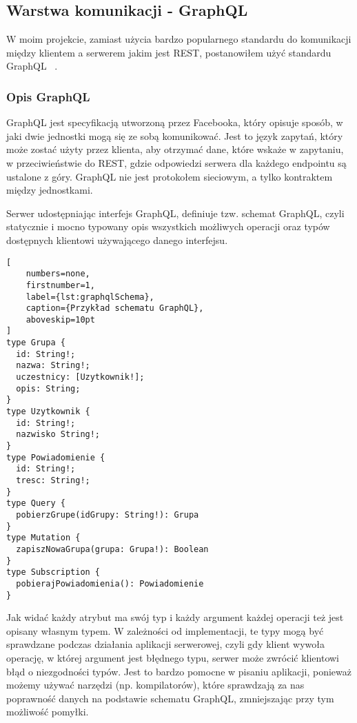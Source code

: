 \subsection{Warstwa komunikacji - GraphQL}
W moim projekcie, zamiast użycia bardzo popularnego standardu do komunikacji między klientem a serwerem jakim jest REST, postanowiłem użyć standardu GraphQL ~\cite{ref_graphql_doc}.

\subsubsection{Opis GraphQL}
GraphQL jest specyfikacją utworzoną przez Facebooka, który opisuje sposób, w jaki dwie jednostki mogą się ze sobą komunikować. Jest to język zapytań, który może zostać użyty przez klienta, aby otrzymać dane, które wskaże w zapytaniu, w przeciwieństwie do REST, gdzie odpowiedzi serwera dla każdego endpointu są ustalone z góry. GraphQL nie jest protokołem sieciowym, a tylko kontraktem między jednostkami.

Serwer udostępniając interfejs GraphQL, definiuje tzw. schemat GraphQL, czyli statycznie i mocno typowany opis wszystkich możliwych operacji oraz typów dostępnych klientowi używającego danego interfejsu.

\begin{addmargin}[6mm]{0mm}
\begin{lstlisting}[
    numbers=none,
    firstnumber=1,
    label={lst:graphqlSchema},
    caption={Przykład schematu GraphQL},
    aboveskip=10pt
]
type Grupa {
  id: String!;
  nazwa: String!;
  uczestnicy: [Uzytkownik!];
  opis: String;
}
type Uzytkownik {
  id: String!;
  nazwisko String!;
}
type Powiadomienie {
  id: String!;
  tresc: String!;
}
type Query {
  pobierzGrupe(idGrupy: String!): Grupa
}
type Mutation {
  zapiszNowaGrupa(grupa: Grupa!): Boolean
}
type Subscription {
  pobierajPowiadomienia(): Powiadomienie
}
\end{lstlisting}
\end{addmargin}
Jak widać każdy atrybut ma swój typ i każdy argument każdej operacji też jest opisany własnym typem. W zależności od implementacji, te typy mogą być sprawdzane podczas działania aplikacji serwerowej, czyli gdy klient wywoła operację, w której argument jest błędnego typu, serwer może zwrócić klientowi błąd o niezgodności typów. Jest to bardzo pomocne w pisaniu aplikacji, ponieważ możemy używać narzędzi (np. kompilatorów), które sprawdzają za nas poprawność danych na podstawie schematu GraphQL, zmniejszając przy tym możliwość pomyłki.

